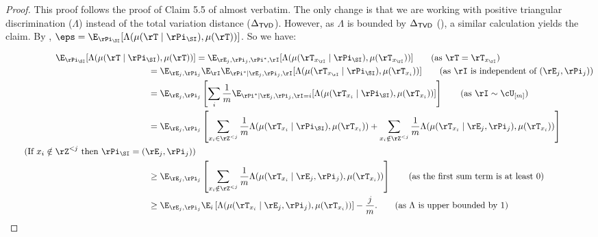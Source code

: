 \begin{proof} 
    This proof follows the proof of Claim 5.5 of \cite{AssadiCK19} almost verbatim. The only change is that we are working with positive triangular discrimination ($\Lambda$) instead of the total variation distance ($\Delta_{\sf TVD}$). However, as $\Lambda$ is bounded by $\Delta_{\sf TVD}$ (), a similar calculation yields the claim.
    By , $\eps = \E_{\rPi_\SI}[\Lambda(\mu(\rT \mid
    \rPi_\SI), \mu(\rT))]$. So we have:

    \begin{align*}
        \E_{\rPi_\SI}[\Lambda(\mu(\rT \mid \rPi_\SI), \mu(\rT))]
        &= \E_{\rE_j, \rPi_j, \rPi^\ast, \rI}
        [\Lambda(\mu(\rT_{x_{\rI}} \mid \rPi_\SI), \mu(\rT_{x_{\rI}}))]
        \tag{as $\rT = \rT_{x_{\rI}}$}\\
        &\hspace{-1.9cm}=
        \E_{\rE_j, \rPi_j} \E_{\rI} \E_{\rPi^\ast\mid \rE_j, \rPi_j, \rI}
        [\Lambda(\mu(\rT_{x_{\rI}} \mid \rPi_\SI), \mu(\rT_{x_i}))]
        \tag{as $\rI$ is independent of $(\rE_j, \rPi_j)$}\\
        &\hspace{-1.9cm}=
        \E_{\rE_j, \rPi_j}
        \left[\sum_i \frac 1 m \E_{\rPi^\ast\mid \rE_j, \rPi_j, \rI = i}
        [\Lambda(\mu(\rT_{x_i} \mid \rPi_\SI), \mu(\rT_{x_i}))]\right]
        \tag{as $\rI \sim \cU_{[m]}$}\\
        &\hspace{-1.9cm}=
        \E_{\rE_j, \rPi_j} \left[\sum_{x_i \in \rZ^{<j}}
          \frac 1 m \Lambda(\mu(\rT_{x_i} \mid \rPi_\SI), \mu(\rT_{x_i}))
        + \sum_{x_i \notin \rZ^{<j}} \frac 1 m \Lambda(\mu(\rT_{x_i} \mid \rE_j,
      \rPi_j), \mu(\rT_{x_i}))\right]\\
        \tag{If $x_i \notin \rZ^{< j}$ then $\rPi_\SI = (\rE_j, \rPi_j)$}\\
         &\hspace{-1.9cm}\geq
         \E_{\rE_j, \rPi_j} \left[\sum_{x_i \notin \rZ^{<j}} \frac 1 m
         \Lambda(\mu(\rT_{x_i} \mid \rE_j, \rPi_j), \mu(\rT_{x_i}))\right]
         \tag{as the first sum term is at least 0}\\
         &\hspace{-1.9cm}\geq \E_{\rE_j, \rPi_j} \E_i\left[
         \Lambda(\mu(\rT_{x_i} \mid \rE_j, \rPi_j), \mu(\rT_{x_i}))\right]
         -\frac{j}{m}. \tag{as $\Lambda$ is upper bounded by 1}
    \end{align*}
\end{proof}



